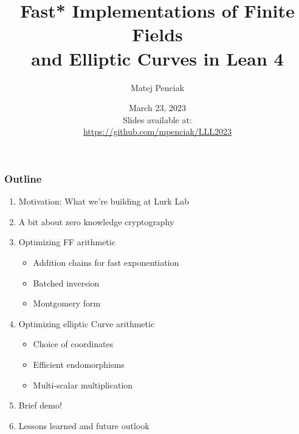 \documentclass[options]{beamer}
\title{Fast* Implementations of Finite Fields \\ and Elliptic Curves in Lean 4}
\author{Matej Penciak}
\institute{Lurk Lab}
\date{March 23, 2023 \\ Slides available at: \\ \url{https://github.com/mpenciak/LLL2023}}
\begin{document}
\frame{\titlepage}

\begin{frame}
    \frametitle{Outline}
    \begin{enumerate}
        \item Motivation: What we're building at Lurk Lab
        \item A bit about zero knowledge cryptography
        \item Optimizing FF arithmetic
        \begin{itemize}
            \item Addition chains for fast exponentiation
            \item Batched inversion
            \item Montgomery form
        \end{itemize}
        \item Optimizing elliptic Curve arithmetic
        \begin{itemize}
            \item Choice of coordinates
            \item Efficient endomorphisms
            \item Multi-scalar multiplication
        \end{itemize}
        \item Brief demo!
        \item Lessons learned and future outlook
    \end{enumerate}
\end{frame}
\end{document}
